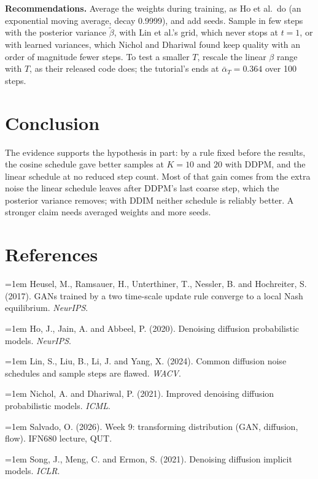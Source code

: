 \documentclass[10pt,a4paper,twocolumn]{article}
\begin{document}
\textbf{Recommendations.} Average the weights during training, as Ho et al.\ do (an exponential
moving average, decay 0.9999), and add seeds. Sample in few steps with the posterior variance $\tilde\beta$, with Lin et al.'s
grid, which never stops at $t = 1$, or with learned variances, which Nichol and Dhariwal found keep quality with an order of magnitude fewer steps. To test a
smaller $T$, rescale the linear $\beta$ range with $T$, as their released code does; the tutorial's
ends at $\bar\alpha_T = 0.364$ over 100 steps.

\section{Conclusion}
The evidence supports the hypothesis in part: by a rule fixed before the results, the cosine schedule gave better samples at $K = 10$ and $20$ with DDPM, and the linear schedule at no reduced step count. Most of that gain comes from the extra noise the linear schedule leaves after DDPM's last
coarse step, which the posterior variance removes; with DDIM neither schedule is reliably better. A stronger
claim needs averaged weights and more seeds.

\section*{References}
\footnotesize
\setlength{\parindent}{0pt}
\newcommand{\bib}[1]{\par\hangindent=1em #1}
\bib{Heusel, M., Ramsauer, H., Unterthiner, T., Nessler, B. and Hochreiter, S. (2017). GANs trained by a two time-scale update rule converge to a local
Nash equilibrium. \emph{NeurIPS}.}
\bib{Ho, J., Jain, A. and Abbeel, P. (2020). Denoising diffusion probabilistic models.
\emph{NeurIPS}.}
\bib{Lin, S., Liu, B., Li, J. and Yang, X. (2024). Common diffusion noise schedules and sample
steps are flawed. \emph{WACV}.}
\bib{Nichol, A. and Dhariwal, P. (2021). Improved denoising diffusion probabilistic models.
\emph{ICML}.}
\bib{Salvado, O. (2026). Week 9: transforming distribution (GAN, diffusion, flow). IFN680
lecture, QUT.}
\bib{Song, J., Meng, C. and Ermon, S. (2021). Denoising diffusion implicit models. \emph{ICLR}.}
\end{document}
